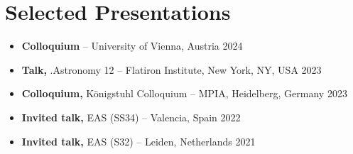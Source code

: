 \section*{Selected Presentations}

\begin{itemize}
    \item \textbf{Colloquium}  -- University of Vienna, Austria \hfill 2024
    \item \textbf{Talk,} .Astronomy 12 -- Flatiron Institute, New York, NY, USA \hfill 2023
    \item \textbf{Colloquium,} Königstuhl Colloquium -- MPIA, Heidelberg, Germany \hfill 2023
    \item \textbf{Invited talk,} EAS (SS34) -- Valencia, Spain \hfill 2022
    \item \textbf{Invited talk,} EAS (S32) -- Leiden, Netherlands \hfill 2021
\end{itemize}